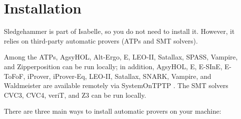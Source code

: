 \documentclass[a4paper,12pt]{article}
\renewcommand\_{\hbox{\textunderscore\kern-.05ex}}
\begin{document}
%

\section{Installation}
\label{installation}

Sledgehammer is part of Isabelle, so you do not need to install it. However, it
relies on third-party automatic provers (ATPs and SMT solvers).

Among the ATPs, AgsyHOL, Alt-Ergo, E, LEO-II, Satallax, SPASS, Vampire, and
Zipperposition can be run locally; in addition, AgsyHOL, E, E-SInE, E-ToFoF,
iProver, iProver-Eq, LEO-II, Satallax, SNARK, Vampire, and Waldmeister are
available remotely via System\-On\-TPTP \cite{sutcliffe-2000}. The SMT solvers
CVC3, CVC4, veriT, and Z3 can be run locally.

There are three main ways to install automatic provers on your machine:
\end{document}
